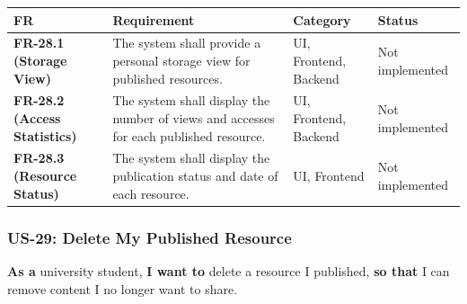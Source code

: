 \documentclass[12pt]{article}
\renewcommand{\baselinestretch}{1.5}
\begin{document}
\begingroup
\small
\renewcommand{\baselinestretch}{1.0}\selectfont
\renewcommand{\arraystretch}{1.15}
\setlength{\tabcolsep}{6pt}
\begin{longtable}{|>{\raggedright\arraybackslash}p{}|>{\raggedright\arraybackslash}p{}|>{\raggedright\arraybackslash}p{}|>{\raggedright\arraybackslash}p{}|}
\hline
\textbf{FR} & \textbf{Requirement} & \textbf{Category} & \textbf{Status} \\ \hline
\endhead
\textbf{FR-28.1 (Storage View)} & The system shall provide a personal storage view for published resources. & UI, Frontend, Backend & Not implemented \\ \hline
\textbf{FR-28.2 (Access Statistics)} & The system shall display the number of views and accesses for each published resource. & UI, Frontend, Backend & Not implemented \\ \hline
\textbf{FR-28.3 (Resource Status)} & The system shall display the publication status and date of each resource. & UI, Frontend & Not implemented \\ \hline
\end{longtable}
\endgroup
\par\medskip

\hypertarget{sec:us-29-delete-my-published-resource}{}
\subsubsection*{US-29: Delete My Published Resource}
\par\medskip

\textbf{As a} university student, \textbf{I want to} delete a resource I published, \textbf{so that} I can remove content I no longer want to share.
\par\medskip
\end{document}

